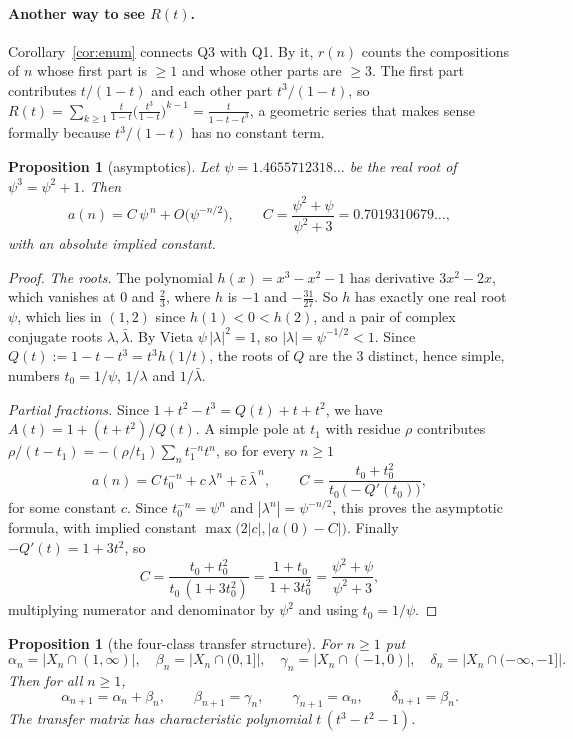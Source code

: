 \documentclass[11pt]{article}
\newtheorem{proposition}[theorem]{Proposition}
\theoremstyle{definition}
\theoremstyle{remark}
\begin{document}
\paragraph{Another way to see $R(t)$.}
Corollary~\ref{cor:enum} connects Q3 with Q1. By it, $r(n)$ counts the compositions of $n$ whose
first part is $\ge1$ and whose other parts are $\ge3$. The first part contributes $t/(1-t)$ and
each other part $t^3/(1-t)$, so
$R(t)=\sum_{k\ge1}\frac{t}{1-t}\bigl(\frac{t^{3}}{1-t}\bigr)^{k-1}=\frac{t}{1-t-t^{3}}$, a geometric
series that makes sense formally because $t^3/(1-t)$ has no constant term.

\begin{proposition}[asymptotics]\label{prop:asymp}
Let $\psi=1.4655712318\ldots$ be the real root of $\psi^3=\psi^2+1$. Then
\[
a(n)=C\,\psi^{\,n}+O\!\bigl(\psi^{-n/2}\bigr),
\qquad
C=\frac{\psi^{2}+\psi}{\psi^{2}+3}=0.7019310679\ldots,
\]
with an absolute implied constant.
\end{proposition}

\begin{proof}
\emph{The roots.} The polynomial $h(x)=x^3-x^2-1$ has derivative $3x^2-2x$, which vanishes at $0$
and $\tfrac23$, where $h$ is $-1$ and $-\tfrac{31}{27}$. So $h$ has exactly one real root $\psi$,
which lies in $(1,2)$ since $h(1)<0<h(2)$, and a pair of complex conjugate roots
$\lambda,\bar\lambda$. By Vieta $\psi\,|\lambda|^{2}=1$, so $|\lambda|=\psi^{-1/2}<1$. Since
$Q(t):=1-t-t^3=t^3h(1/t)$, the roots of $Q$ are the 3 distinct, hence simple, numbers $t_0=1/\psi$,
$1/\lambda$ and $1/\bar\lambda$.

\emph{Partial fractions.} Since $1+t^2-t^3=Q(t)+t+t^2$, we have $A(t)=1+(t+t^2)/Q(t)$. A simple pole
at $t_1$ with residue $\rho$ contributes $\rho/(t-t_1)=-(\rho/t_1)\sum_n t_1^{-n}t^n$, so for every
$n\ge1$
\[
a(n)=C\,t_0^{-n}+c\,\lambda^{n}+\bar c\,\bar\lambda^{\,n},\qquad
C=\frac{t_0+t_0^2}{t_0\,\bigl(-Q'(t_0)\bigr)},
\]
for some constant $c$. Since $t_0^{-n}=\psi^n$ and $|\lambda^n|=\psi^{-n/2}$, this proves the
asymptotic formula, with implied constant $\max\bigl(2|c|,|a(0)-C|\bigr)$. Finally
$-Q'(t)=1+3t^2$, so
\[
C=\frac{t_{0}+t_{0}^{2}}{t_{0}\,(1+3t_{0}^{2})}=\frac{1+t_{0}}{1+3t_{0}^{2}}
=\frac{\psi^{2}+\psi}{\psi^{2}+3},
\]
multiplying numerator and denominator by $\psi^{2}$ and using $t_{0}=1/\psi$.
\end{proof}

\begin{proposition}[the four-class transfer structure]\label{prop:classes}
For $n\ge1$ put
\[
\alpha_n=|X_n\cap(1,\infty)|,\quad
\beta_n=|X_n\cap(0,1]|,\quad
\gamma_n=|X_n\cap(-1,0)|,\quad
\delta_n=|X_n\cap(-\infty,-1]| .
\]
Then for all $n\ge1$,
\[
\alpha_{n+1}=\alpha_n+\beta_n,\qquad
\beta_{n+1}=\gamma_n,\qquad
\gamma_{n+1}=\alpha_n,\qquad
\delta_{n+1}=\beta_n .
\]
The transfer matrix has characteristic polynomial $t\,(t^{3}-t^{2}-1)$.
\end{proposition}
\end{document}
